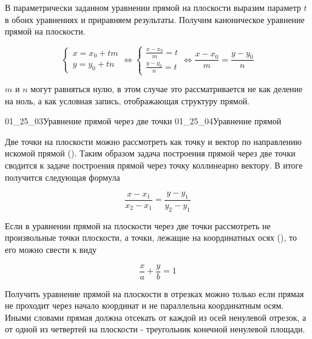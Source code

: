 В параметрически заданном уравнении прямой на плоскости выразим параметр \(t\) в
обоих уравнениях и приравняем результаты. Получим каноническое уравнение прямой
на плоскости.

\begin{equation*}
  \begin{cases}
    x = x_0 + tm \\
    y = y_0 + tn
  \end{cases}
  \iff
  \begin{cases}
    \frac{x - x_0}{m} = t \\
    \frac{y - y_0}{n} = t
  \end{cases}
  \iff
  \frac{x - x_0}{m} = \frac{y - y_0}{n}
\end{equation*}

\begin{remark}
  \(m\) и \(n\) могут равняться нулю, в этом случае это рассматривается не как
  деление на ноль, а как условная запись, отображающая структуру прямой.
\end{remark}

\gallerydouble
  {01_25_03}{Уравнение прямой через две точки}
  {01_25_04}{Уравнение прямой }


Две точки на плоскости можно рассмотреть как точку и вектор по направлению
искомой прямой (). Таким образом задача построения прямой через
две точки сводится к задаче построения прямой через точку коллинеарно вектору. В
итоге получится следующая формула

\begin{equation*}
  \frac{x - x_1}{x_2 - x_1} = \frac{y - y_1}{y_2 - y_1}
\end{equation*}


Если в уравнении прямой на плоскости через две точки рассмотреть не произвольные
точки плоскости, а точки, лежащие на координатных осях (), то
его можно свести к виду

\begin{equation*}
  \frac{x}{a} + \frac{y}{b} = 1
\end{equation*}

\begin{remark}
  Получить уравнение прямой на плоскости в отрезках можно только если прямая не
  проходит через начало координат и не параллельна координатным осям. Иными
  словами прямая должна отсекать от каждой из осей ненулевой отрезок, а от одной
  из четвертей на плоскости - треугольник конечной ненулевой площади.
\end{remark}
